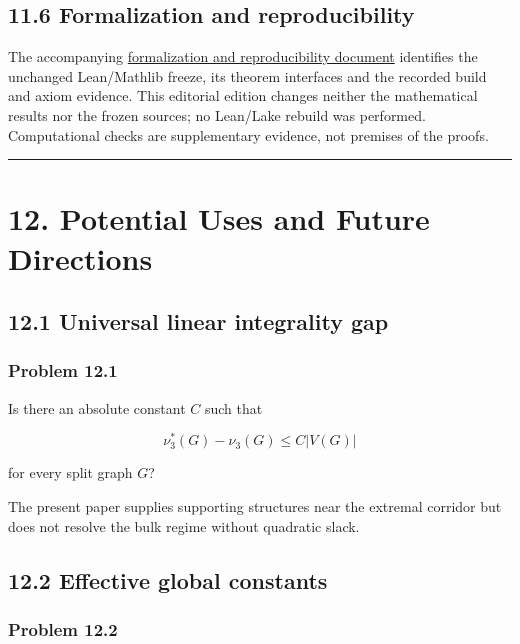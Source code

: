 \documentclass[english,11pt,a4paper]{article}
\begin{document}
\subsection{11.6 Formalization and
reproducibility}\label{formalization-and-reproducibility}

The accompanying
\href{https://github.com/jtraverso/erdos-81-chordal-clique-partitions/blob/main/preprints/PAPER_III/05_formalization/FORMALIZATION_COMPANION_v1.6_en.pdf}{formalization
and reproducibility document} identifies the unchanged Lean/Mathlib
freeze, its theorem interfaces and the recorded build and axiom
evidence. This editorial edition changes neither the mathematical
results nor the frozen sources; no Lean/Lake rebuild was performed.
Computational checks are supplementary evidence, not premises of the
proofs.

\begin{center}\rule{0.5\linewidth}{0.5pt}\end{center}

\section{12. Potential Uses and Future
Directions}\label{potential-uses-and-future-directions}

\subsection{12.1 Universal linear integrality
gap}\label{universal-linear-integrality-gap}

\subsubsection{Problem 12.1}\label{problem-12.1}

Is there an absolute constant \(C\) such that

\[
\nu_3^*(G)-\nu_3(G)
\le C|V(G)|
\]

for every split graph \(G\)?

The present paper supplies supporting structures near the extremal
corridor but does not resolve the bulk regime without quadratic slack.

\subsection{12.2 Effective global
constants}\label{effective-global-constants}

\subsubsection{Problem 12.2}\label{problem-12.2}
\end{document}
